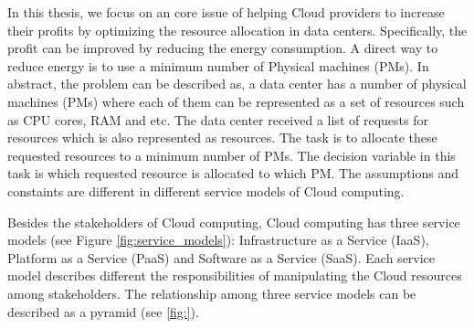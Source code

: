 In this thesis, we focus on an core issue of helping Cloud providers to increase their profits by optimizing the resource allocation in data centers. Specifically, the profit can be improved by reducing the energy consumption. A direct way to reduce energy is to use a minimum number of Physical machines (PMs). In abstract, the problem can be described as, a data center has a number of physical machines (PMs) where each of them can be represented as a set of resources such as CPU cores, RAM and etc. The data center received a list of requests for resources which is also represented as resources. The task is to allocate these requested resources to a minimum number of PMs. The decision variable in this task is which requested resource is allocated to which PM. The assumptions and constaints are different in different service models of Cloud computing.

Besides the stakeholders of Cloud computing, Cloud computing has three service models \cite{Mell:2011jj} (see Figure \ref{fig:service_models}): Infrastructure as a Service (IaaS), Platform as a Service (PaaS) and Software as a Service (SaaS). Each service model describes different the responsibilities of manipulating the Cloud resources among stakeholders.
The relationship among three service models can be described as a pyramid (see \ref{fig:}). 

